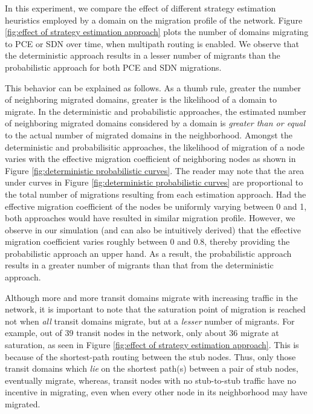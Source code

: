 \documentclass[smallextended]{svjour3}
\begin{document}
In this experiment, we compare the effect of different strategy estimation
heuristics employed by a domain on the migration profile of the network. Figure
\ref{fig:effect of strategy estimation approach} plots the number of domains
migrating to PCE or SDN over time, when multipath routing is enabled. We observe
that the deterministic approach results in a lesser number of migrants than the
probabilistic approach for both PCE and SDN migrations.

\par This behavior can be explained as follows. As a thumb rule, greater the
number of neighboring migrated domains, greater is the likelihood of a domain to
migrate. In the deterministic and probabilistic approaches, the estimated number
of neighboring migrated domains considered by a domain is \emph{greater than or
equal} to the actual number of migrated domains in the neighborhood. Amongst the
deterministic and probabilisitic approaches, the likelihood of migration of a
node varies with the effective migration coefficient of neighboring nodes as
shown in Figure \ref{fig:deterministic probabilistic curves}. The reader may
note that the area under curves in Figure \ref{fig:deterministic probabilistic
curves} are proportional to the total number of migrations resulting from each
estimation approach. Had the effective migration coefficient of the nodes be uniformly
varying between 0 and 1, both approaches would have resulted in similar
migration profile. However, we observe in our simulation (and can also be
intuitively derived) that the effective migration coefficient varies roughly
between 0 and 0.8, thereby providing the probabilistic approach an upper hand.
As a result, the probabilistic approach results in a greater number of migrants
than that from the deterministic approach.

\par Although more and more transit domains migrate with increasing traffic in
the network, it is important to note that the saturation point of migration is
reached not when \emph{all} transit domains migrate, but at a \emph{lesser} number of
migrants. For example, out of 39 transit nodes in the network, only about 36
migrate at saturation, as seen in Figure \ref{fig:effect of strategy estimation
approach}. This is because of the shortest-path routing between the stub nodes.
Thus, only those transit domains which \emph{lie} on the shortest path(s) between a pair of stub nodes, eventually migrate, whereas,
transit nodes with no stub-to-stub traffic have no incentive in migrating, even
when every other node in its neighborhood may have migrated.
\end{document}
